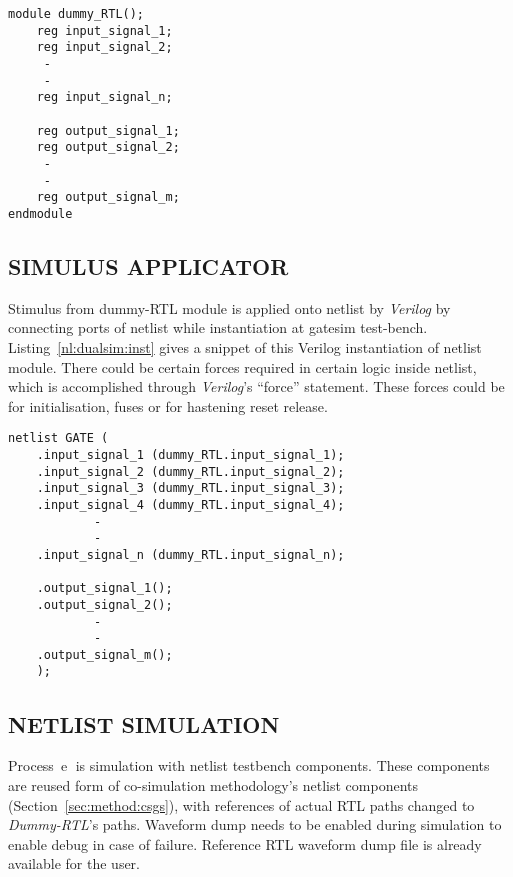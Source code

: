 \lstset{language=Verilog,
basicstyle=\footnotesize,
frame=shadowbox,
breaklines=true}          
\begin{lstlisting}[frame=single, caption=Dummy RTL Module, label=nl:dualsim:dummy]  
module dummy_RTL();
	reg input_signal_1;
	reg input_signal_2;
	 -
	 -
	reg input_signal_n;
					
	reg output_signal_1;
	reg output_signal_2;
	 -
	 -
	reg output_signal_m;
endmodule
\end{lstlisting}



\subsection{SIMULUS APPLICATOR}
Stimulus from dummy-RTL module is applied onto netlist by {\it Verilog} by connecting ports of netlist while instantiation at gatesim test-bench.  Listing~\ref{nl:dualsim:inst} gives a snippet of this Verilog instantiation of netlist module. There could be certain forces required in certain logic inside netlist, which is accomplished through {\it Verilog}'s ``force'' statement. These forces could be for initialisation, fuses or for hastening reset release.

\lstset{language=Verilog,
basicstyle=\footnotesize,
frame=shadowbox,
breaklines=true}          
\begin{lstlisting}[frame=single, caption=Verilog Instantiation, label=nl:dualsim:inst]  
netlist GATE (
	.input_signal_1 (dummy_RTL.input_signal_1);
	.input_signal_2 (dummy_RTL.input_signal_2);
	.input_signal_3 (dummy_RTL.input_signal_3);
	.input_signal_4 (dummy_RTL.input_signal_4);
			-
			-
	.input_signal_n (dummy_RTL.input_signal_n);

	.output_signal_1();
	.output_signal_2();
			-
			-
	.output_signal_m();
	);

\end{lstlisting}



\subsection{NETLIST SIMULATION}
Process~\textcircled{e} is simulation with netlist testbench components. These components are reused form of co-simulation methodology's netlist components (Section~\ref{sec:method:csgs}), with references of actual RTL paths changed to {\it Dummy-RTL}'s paths. Waveform dump needs to be enabled during simulation to enable debug in case of failure. Reference RTL waveform dump file is already available for the user.


